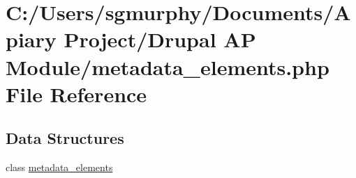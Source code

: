 \hypertarget{metadata__elements_8php}{
\section{C:/Users/sgmurphy/Documents/Apiary Project/Drupal AP Module/metadata\_\-elements.php File Reference}
\label{metadata__elements_8php}
}
\subsection*{Data Structures}
\begin{DoxyCompactItemize}
\item 
class \hyperlink{classmetadata__elements}{metadata\_\-elements}
\end{DoxyCompactItemize}
